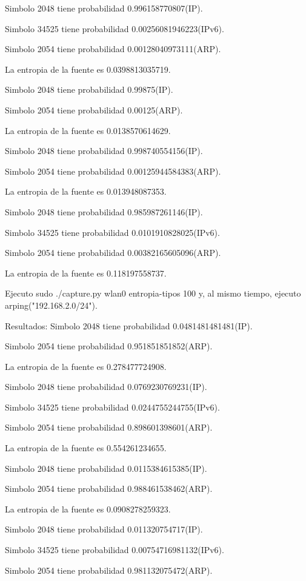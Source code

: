 \documentclass[a4paper]{article}
\begin{document}
Simbolo 2048 tiene probabilidad 0.996158770807(IP).

Simbolo 34525 tiene probabilidad 0.00256081946223(IPv6).

Simbolo 2054 tiene probabilidad 0.00128040973111(ARP).

La entropia de la fuente es 0.0398813035719.

Simbolo 2048 tiene probabilidad 0.99875(IP).

Simbolo 2054 tiene probabilidad 0.00125(ARP).

La entropia de la fuente es 0.0138570614629.

Simbolo 2048 tiene probabilidad 0.998740554156(IP).

Simbolo 2054 tiene probabilidad 0.00125944584383(ARP).

La entropia de la fuente es 0.013948087353.

Simbolo 2048 tiene probabilidad 0.985987261146(IP).

Simbolo 34525 tiene probabilidad 0.0101910828025(IPv6).

Simbolo 2054 tiene probabilidad 0.00382165605096(ARP).

La entropia de la fuente es 0.118197558737.

Ejecuto  sudo ./capture.py wlan0 entropia-tipos 100 y, al mismo tiempo, ejecuto arping("192.168.2.0/24").

Resultados:
Simbolo 2048 tiene probabilidad 0.0481481481481(IP).

Simbolo 2054 tiene probabilidad 0.951851851852(ARP).

La entropia de la fuente es 0.278477724908.

Simbolo 2048 tiene probabilidad 0.0769230769231(IP).

Simbolo 34525 tiene probabilidad 0.0244755244755(IPv6).

Simbolo 2054 tiene probabilidad 0.898601398601(ARP).

La entropia de la fuente es 0.554261234655.

Simbolo 2048 tiene probabilidad 0.0115384615385(IP).

Simbolo 2054 tiene probabilidad 0.988461538462(ARP).

La entropia de la fuente es 0.0908278259323.

Simbolo 2048 tiene probabilidad 0.011320754717(IP).

Simbolo 34525 tiene probabilidad 0.00754716981132(IPv6).

Simbolo 2054 tiene probabilidad 0.981132075472(ARP).
\end{document}
